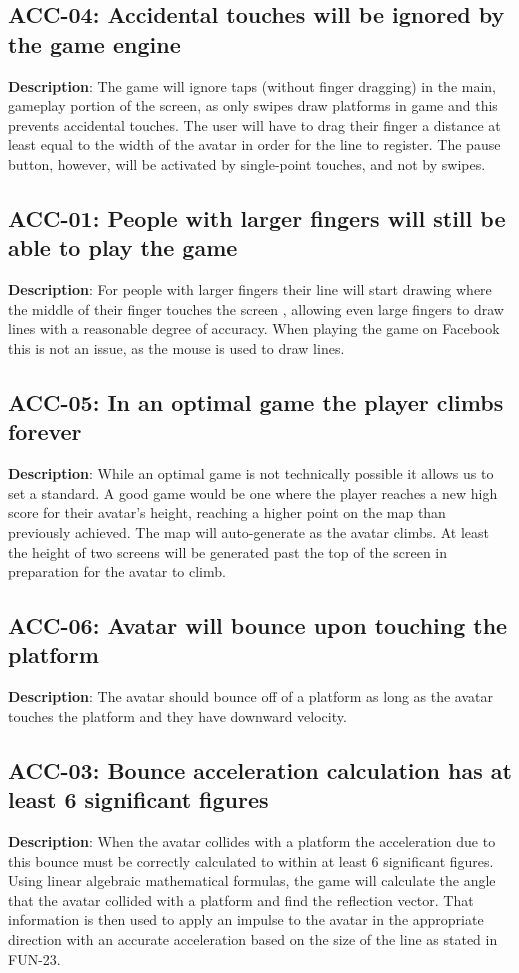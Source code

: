 \subsection{ACC-04: Accidental touches will be ignored by the game engine}
\textbf{Description}: The game will ignore taps (without finger dragging) in
the main, gameplay portion of the screen, as only swipes draw platforms
in game and this prevents accidental touches. The user will have to
drag their finger a distance at least equal to the width of the avatar
in order for the line to register. The pause button, however, will
be activated by single-point touches, and not by swipes.
\subsection{ACC-01: People with larger fingers will still be able to play the
game}
\textbf{Description}: For people with larger fingers their line will start
drawing where the middle of their finger touches the screen , allowing
even large fingers to draw lines with a reasonable degree of accuracy.
When playing the game on Facebook this is not an issue, as the mouse
is used to draw lines. 
\subsection{ACC-05: In an optimal game the player climbs forever}
\textbf{Description}: While an optimal game is not technically possible it
allows us to set a standard. A good game would be one where the player
reaches a new high score for their avatar\textquoteright{}s height,
reaching a higher point on the map than previously achieved. The map
will auto-generate as the avatar climbs. At least the height of two
screens will be generated past the top of the screen in preparation
for the avatar to climb.
\subsection{ACC-06: Avatar will bounce upon touching the platform}
\textbf{Description}: The avatar should bounce off of a platform as long as
the avatar touches the platform and they have downward velocity.
\subsection{ACC-03: Bounce acceleration calculation has at least 6 significant
figures}
\textbf{Description}: When the avatar collides with a platform the acceleration
due to this bounce must be correctly calculated to within at least
6 significant figures. Using linear algebraic mathematical formulas,
the game will calculate the angle that the avatar collided with a
platform and find the reflection vector. That information is then
used to apply an impulse to the avatar in the appropriate direction
with an accurate acceleration based on the size of the line as stated
in FUN-23.
